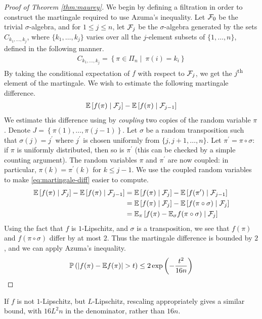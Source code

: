 \documentclass[11pt]{article}
\begin{document}
\begin{proof}[Proof of Theorem \ref{thm:maurey}]
  We begin by defining a filtration in order to construct the martingale required to use Azuma's inequality.
  Let $\mathcal{F}_0$ be the trivial $\sigma$-algebra, and for $1 \leq j \leq n$, let $\mathcal{F}_j$ be the $\sigma$-algebra generated by the sets $C_{k_1, \ldots, k_j}$, where $\{k_1, \ldots, k_j\}$ varies over all the $j$-element subsets of $\{1, \ldots, n\}$, defined in the following manner.
  \begin{align*}
    C_{k_1, \ldots, k_j} = \left\{ \pi \in \Pi_n\mid\ \pi(i) = k_i \right\}
  \end{align*}
  By taking the conditional expectation of $f$ with respect to $\mathcal{F}_j$, we get the $j$\textsuperscript{th} element of the martingale.
  We wish to estimate the following martingale difference.
  \begin{align}
    \label{eq:martingale-diff}
    \mathbb{E}\left[ f(\pi) \mid \mathcal{F}_j \right] - \mathbb{E}\left[ f(\pi) \mid \mathcal{F}_{j-1} \right]
  \end{align}
  We estimate this difference using by \emph{coupling} two copies of the random variable $\pi$.
  Denote $J = \left\{ \pi(1), \ldots, \pi(j-1) \right\}$.
  Let $\sigma$ be a random transposition such that $\sigma(j) = j^{\prime}$ where $j^{\prime}$ is chosen uniformly from $\{j, j+1, \ldots, n\}$.
  Let $\pi^{\prime} = \pi \circ \sigma$: if $\pi$ is uniformly distributed, then so is $\pi^{\prime}$ (this can be checked by a simple counting argument).
  The random variables $\pi$ and $\pi^{\prime}$ are now coupled: in particular, $\pi(k) = \pi^{\prime}(k)$ for $k \leq j-1$.
  We use the coupled random variables to make \eqref{eq:martingale-diff} easier to compute.
  \begin{align*}
    \mathbb{E}\left[ f(\pi) \mid \mathcal{F}_j \right] - \mathbb{E}\left[ f(\pi) \mid \mathcal{F}_{j-1} \right]
    &= \mathbb{E}\left[ f(\pi) \mid \mathcal{F}_j \right] - \mathbb{E}\left[ f(\pi^{\prime}) \mid \mathcal{F}_{j-1} \right] \\
    &= \mathbb{E}\left[ f(\pi) \mid \mathcal{F}_j \right] - \mathbb{E}\left[ f(\pi \circ \sigma) \mid \mathcal{F}_{j} \right] \\
    &= \mathbb{E}_{\pi} \left[ f(\pi) - \mathbb{E}_{\sigma} f(\pi \circ \sigma) \mid \mathcal{F}_j \right]
  \end{align*}
  {\color{red} } Using the fact that $f$ is $1$-Lipschitz, and $\sigma$ is a transposition, we see that $f(\pi)$ and $f(\pi \circ \sigma)$ differ by at most $2$.
  Thus the martingale difference is bounded by $2$, and we can apply Azuma's inequality.
  \begin{align*}
    \mathbb{P}\left( \left| f(\pi) - \mathbb{E} f(\pi) \right| > t \right) \leq 2 \exp \left( - \frac{t^2}{16n} \right)
  \end{align*}
\end{proof}
\begin{remark}
  If $f$ is not $1$-Lipschitz, but $L$-Lipschitz, rescaling appropriately gives a similar bound, with $16L^2n$ in the denominator, rather than $16n$.
\end{remark}
\end{document}
